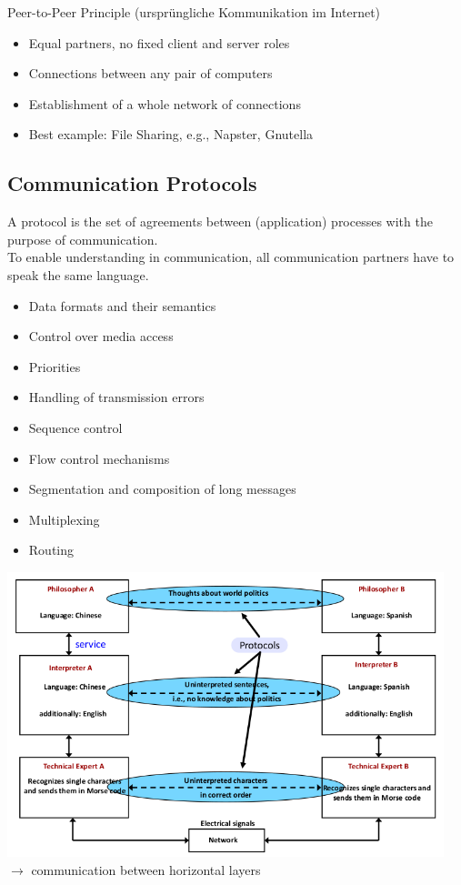 \documentclass[11pt,ngerman]{article}
\begin{document}
Peer-to-Peer	Principle (ursprüngliche Kommunikation im Internet)
\begin{itemize}
	\item Equal	partners,	no	fixed	client	and	server	roles
	\item Connections	between	any	pair	of	computers
	\item Establishment	of	a	whole	network	of	connections
	\item Best	example:	File	Sharing,	e.g.,	Napster,	Gnutella
\end{itemize}

\subsection{Communication	Protocols}

A	protocol	is	the	set	of	agreements	between	(application)	processes	with	the	purpose	of	
communication.\\
To	enable	understanding	in	communication,	all	communication	partners	have	to	speak	the	
same	language.
\begin{itemize}
\item Data	formats	and	their	semantics
\item Control	over	media	access
\item Priorities
\item Handling	of	transmission	errors
\item Sequence	control
\item Flow	control	mechanisms
\item Segmentation	and	composition	of	long	messages
\item Multiplexing
\item Routing
\end{itemize}
	\includegraphics[width=5in]{images/Selection_006.png}\\
	$\rightarrow$ communication between horizontal layers
	
\end{document}
